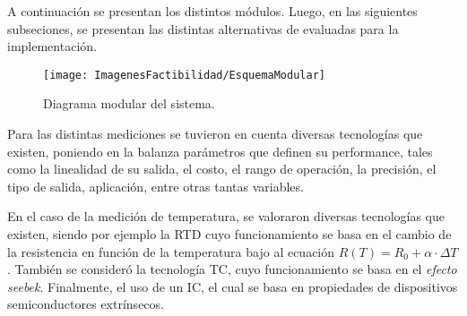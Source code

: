 




A continuación se presentan los distintos módulos. Luego, en las siguientes subseciones, se presentan las distintas alternativas de evaluadas para la implementación.

\begin{figure}[H]
	\centering
	\texttt{[image: ImagenesFactibilidad/EsquemaModular]}
	\label{fig:esquema_modular}
	\caption{Diagrama modular del sistema.}
\end{figure}


Para las distintas mediciones se tuvieron en cuenta diversas tecnologías que existen, poniendo en la balanza parámetros que definen su performance, tales como la linealidad de su salida, el costo, el rango de operación, la precisión, el tipo de salida, aplicación, entre otras tantas variables.

En el caso de la medición de temperatura, se valoraron diversas tecnologías que existen, siendo por ejemplo la RTD cuyo funcionamiento se basa en el cambio de la resistencia en función de la temperatura bajo al ecuación $R(T)=R_0 + \alpha \cdot \Delta T$. También se consideró la tecnología TC, cuyo funcionamiento se basa en el \textit{efecto seebek}. Finalmente, el uso de un IC, el cual se basa en propiedades de dispositivos semiconductores extrínsecos.

